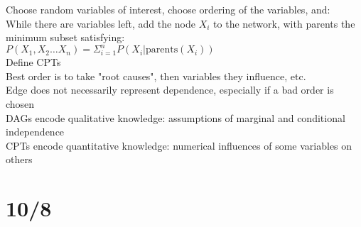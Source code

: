\documentclass[10pt,letterpaper,unboxed,cm]{article}
\begin{document}
Choose random variables of interest, choose ordering of the variables, and:\\
While there are variables left, add the node $X_i$ to the network, with parents the minimum subset satisfying:\\
$P(X_1, X_2 \ldots X_n) = \Sigma^n_{i=1}P(X_i|\text{parents}(X_i))$\\
Define CPTs\\
Best order is to take "root causes", then variables they influence, etc.\\
Edge does not necessarily represent dependence, especially if a bad order is chosen\\
DAGs encode qualitative knowledge: assumptions of marginal and conditional independence\\
CPTs encode quantitative knowledge: numerical influences of some variables on others\\
\section{10/8}
\end{document}
